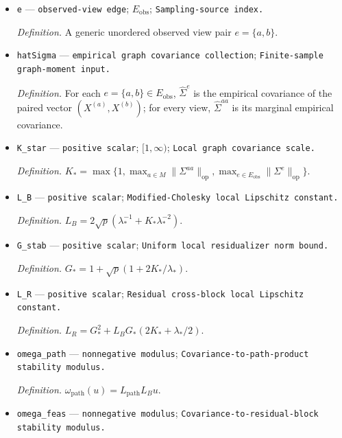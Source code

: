 \documentclass{article}
\begin{document}
\begin{itemize}
  \par\smallskip\noindent\emph{Definition.} \texttt{The unordered pairs of views whose cross-\allowbreak{}covariance blocks are observed.}
  \item \texttt{e} --- \texttt{observed-\allowbreak{}view edge}; \(E_{\mathrm{obs}}\); \texttt{Sampling-\allowbreak{}source index.}
  \par\smallskip\noindent\emph{Definition.} A generic unordered observed view pair \(e=\{a,b\}\).
  \item \texttt{hatSigma} --- \texttt{empirical graph covariance collection}; \texttt{Finite-\allowbreak{}sample graph-\allowbreak{}moment input.}
  \par\smallskip\noindent\emph{Definition.} For each \(e=\{a,b\}\in E_{\mathrm{obs}}\), \(\widehat\Sigma^e\) is the empirical covariance of the paired vector \((X^{(a)},X^{(b)})\); for every view, \(\widehat\Sigma^{aa}\) is its marginal empirical covariance.
  \item \texttt{K\_\allowbreak{}star} --- \texttt{positive scalar}; \([1,\infty)\); \texttt{Local graph covariance scale.}
  \par\smallskip\noindent\emph{Definition.} \(K_*=\max\{1,\max_{a\in M}\|\Sigma^{aa}\|_{\mathrm{op}},\max_{e\in E_{\mathrm{obs}}}\|\Sigma^e\|_{\mathrm{op}}\}\).
  \item \texttt{L\_\allowbreak{}B} --- \texttt{positive scalar}; \texttt{Modified-\allowbreak{}Cholesky local Lipschitz constant.}
  \par\smallskip\noindent\emph{Definition.} \(L_B=2\sqrt p(\lambda_*^{-1}+K_*\lambda_*^{-2})\).
  \item \texttt{G\_\allowbreak{}stab} --- \texttt{positive scalar}; \texttt{Uniform local residualizer norm bound.}
  \par\smallskip\noindent\emph{Definition.} \(G_*=1+\sqrt p(1+2K_*/\lambda_*)\).
  \item \texttt{L\_\allowbreak{}R} --- \texttt{positive scalar}; \texttt{Residual cross-\allowbreak{}block local Lipschitz constant.}
  \par\smallskip\noindent\emph{Definition.} \(L_R=G_*^2+L_BG_*(2K_*+\lambda_*/2)\).
  \item \texttt{omega\_\allowbreak{}path} --- \texttt{nonnegative modulus}; \texttt{Covariance-\allowbreak{}to-\allowbreak{}path-\allowbreak{}product stability modulus.}
  \par\smallskip\noindent\emph{Definition.} \(\omega_{\mathrm{path}}(u)=L_{\mathrm{path}}L_Bu\).
  \item \texttt{omega\_\allowbreak{}feas} --- \texttt{nonnegative modulus}; \texttt{Covariance-\allowbreak{}to-\allowbreak{}residual-\allowbreak{}block stability modulus.}

\end{itemize}
\end{document}
